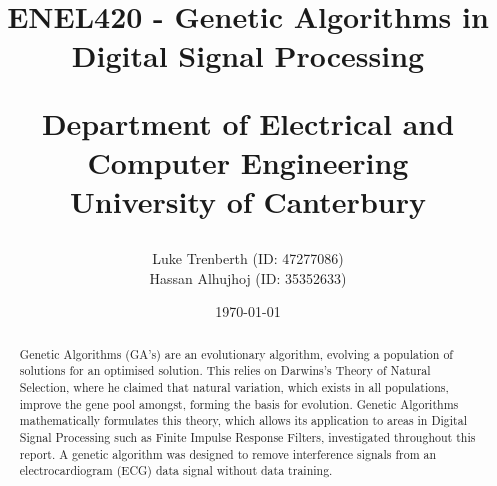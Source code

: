 \documentclass[a4paper, 11pt]{article}
\title{
    ENEL420 - Genetic Algorithms in Digital Signal Processing\\
    \vspace{2cm}
    \begin{large} 
        Department of Electrical and Computer Engineering\\
        University of Canterbury\\
    \end{large}
    \vspace{2cm}
}
\author{
    \small {Luke Trenberth (ID: 47277086)}\\
    \small {Hassan Alhujhoj (ID: 35352633)}\\
    }
\date{\small\today}
\begin{document}
\maketitle

\vspace{2cm}
\begin{abstract}
    \textrm {
        Genetic Algorithms (GA's) are an evolutionary algorithm, evolving a population of solutions for an optimised 
        solution. This relies on Darwins's Theory of Natural Selection, where he claimed that natural variation, which exists in
        all populations, improve the gene pool amongst, forming the basis for evolution. Genetic Algorithms mathematically 
        formulates this theory, which allows its application to areas in Digital Signal Processing such as 
        Finite Impulse Response Filters, investigated throughout this report. A genetic algorithm was designed to remove
        interference signals from an electrocardiogram (ECG) data signal without data training.
    }
\end{abstract}

\pagebreak
{}
\tableofcontents
{}
\pagebreak
\end{document}

